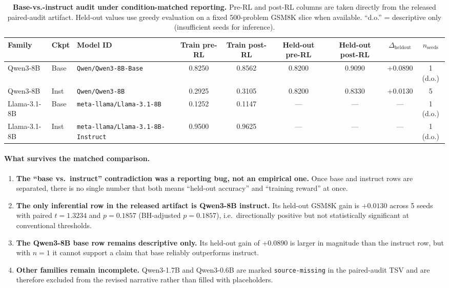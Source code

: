 \begin{table}[t]
\centering
\caption{\textbf{Base-vs.-instruct audit under condition-matched reporting.}
Pre-RL and post-RL columns are taken directly from the released paired-audit
artifact. Held-out values use greedy evaluation on a fixed 500-problem GSM8K
slice when available. ``d.o.'' = descriptive only (insufficient seeds for
inference).}
\label{tab:paired-bi}
\small
\begin{tabular}{@{}l l l c c c c c c@{}}
\toprule
\textbf{Family} & \textbf{Ckpt} & \textbf{Model ID} &
\textbf{Train pre-RL} & \textbf{Train post-RL} &
\textbf{Held-out pre-RL} & \textbf{Held-out post-RL} &
\textbf{$\Delta_{\mathrm{heldout}}$} & \textbf{$n_{\text{seeds}}$} \\
\midrule
Qwen3-8B     & Base & \texttt{Qwen/Qwen3-8B-Base}      & 0.8250 & 0.8562 & 0.8200 & 0.9090 & +0.0890 & 1 (d.o.) \\
Qwen3-8B     & Inst & \texttt{Qwen/Qwen3-8B}           & 0.2925 & 0.3105 & 0.8200 & 0.8330 & +0.0130 & 5 \\
Llama-3.1-8B & Base & \texttt{meta-llama/Llama-3.1-8B} & 0.1252 & 0.1147 & ---    & ---    & ---     & 1 (d.o.) \\
Llama-3.1-8B & Inst & \texttt{meta-llama/Llama-3.1-8B-Instruct} & 0.9500 & 0.9625 & --- & --- & --- & 1 (d.o.) \\
\bottomrule
\end{tabular}
\end{table}

\paragraph{What survives the matched comparison.}
\begin{enumerate}
  \item \textbf{The ``base vs.\ instruct'' contradiction was a reporting bug,
        not an empirical one.} Once base and instruct rows are separated,
        there is no single number that both means ``held-out accuracy'' and
        ``training reward'' at once.
  \item \textbf{The only inferential row in the released artifact is
        Qwen3-8B instruct.} Its held-out GSM8K gain is
        $+0.0130$ across 5 seeds with paired $t=1.3234$ and
        $p=0.1857$ (BH-adjusted $p=0.1857$), i.e.\ directionally positive
        but not statistically significant at conventional thresholds.
  \item \textbf{The Qwen3-8B base row remains descriptive only.} Its
        held-out gain of $+0.0890$ is larger in magnitude than the instruct
        row, but with $n=1$ it cannot support a claim that base reliably
        outperforms instruct.
  \item \textbf{Other families remain incomplete.} Qwen3-1.7B and Qwen3-0.6B
        are marked \texttt{source-missing} in the paired-audit TSV and are
        therefore excluded from the revised narrative rather than filled with
        placeholders.
\end{enumerate}

